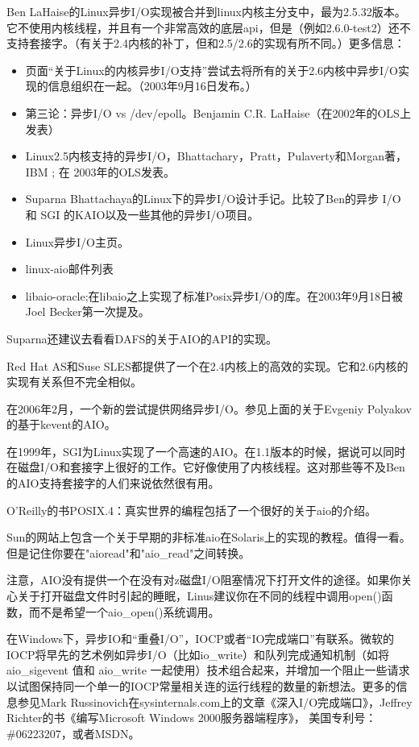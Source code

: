 \documentclass[12pt, twoside, a4paper, xetex]{report}
\begin{document}
	Ben LaHaise的Linux异步I/O实现被合并到linux内核主分支中，最为2.5.32版本。它不使用内核线程，并且有一个非常高效的底层api，但是（例如2.6.0-test2）还不支持套接字。（有关于2.4内核的补丁，但和2.5/2.6的实现有所不同。）更多信息：

	\begin{itemize}
		\item 页面“关于Linux的内核异步I/O支持”尝试去将所有的关于2.6内核中异步I/O实现的信息组织在一起。（2003年9月16日发布。）
		\item 第三论：异步I/O vs /dev/epoll。Benjamin C.R. LaHaise（在2002年的OLS上发表）
		\item Linux2.5内核支持的异步I/O，Bhattachary，Pratt，Pulaverty和Morgan著，IBM ; 在 2003年的OLS发表。
		\item Suparna Bhattachaya的Linux下的异步I/O设计手记。比较了Ben的异步 I/O 和 SGI 的KAIO以及一些其他的异步I/O项目。
		\item Linux异步I/O主页。
		\item linux-aio邮件列表
		\item libaio-oracle;在libaio之上实现了标准Posix异步I/O的库。在2003年9月18日被Joel Becker第一次提及。
	\end{itemize}

	Suparna还建议去看看DAFS的关于AIO的API的实现。

	Red Hat AS和Suse SLES都提供了一个在2.4内核上的高效的实现。它和2.6内核的实现有关系但不完全相似。

	在2006年2月，一个新的尝试提供网络异步I/O。参见上面的关于Evgeniy Polyakov的基于kevent的AIO。

	在1999年，SGI为Linux实现了一个高速的AIO。在1.1版本的时候，据说可以同时在磁盘I/O和套接字上很好的工作。它好像使用了内核线程。这对那些等不及Ben的AIO支持套接字的人们来说依然很有用。

	O'Reilly的书POSIX.4：真实世界的编程包括了一个很好的关于aio的介绍。

	Sun的网站上包含一个关于早期的非标准aio在Solaris上的实现的教程。值得一看。但是记住你要在"aioread"和"aio\_read"之间转换。

	注意，AIO没有提供一个在没有对z磁盘I/O阻塞情况下打开文件的途径。如果你关心关于打开磁盘文件时引起的睡眠，Linus建议你在不同的线程中调用open()函数，而不是希望一个aio\_open()系统调用。

	在Windows下，异步IO和“重叠I/O”，IOCP或者“IO完成端口”有联系。微软的IOCP将早先的艺术例如异步I/O（比如io\_write）和队列完成通知机制（如将\\aio\_sigevent 值和 aio\_write 一起使用）技术组合起来，并增加一个阻止一些请求以试图保持同一个单一的IOCP常量相关连的运行线程的数量的新想法。更多的信息参见Mark Russinovich在sysinternals.com上的文章《深入I/O完成端口》，Jeffrey Richter的书《编写Microsoft Windows 2000服务器端程序》， 美国专利号：\#06223207，或者MSDN。
\end{document}

